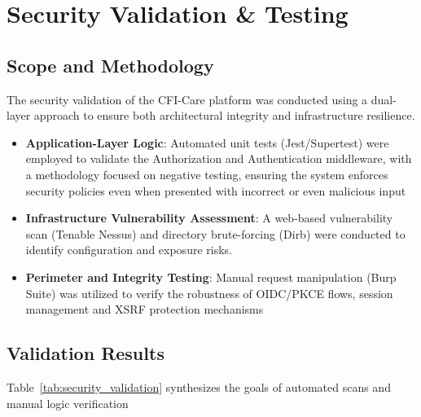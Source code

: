 \section{Security Validation \& Testing}\label{sec:testing_results}

\subsection{Scope and Methodology}
The security validation of the CFI-Care platform was conducted using a dual-layer approach to ensure both architectural integrity and infrastructure resilience.
\begin{itemize}
    \item \textbf{Application-Layer Logic}: Automated unit tests (Jest/Supertest) were employed to validate the Authorization and Authentication middleware, 
    with a methodology focused on negative testing, ensuring the system enforces security policies even when presented with incorrect or even malicious input
    \item \textbf{Infrastructure Vulnerability Assessment}: A web-based vulnerability scan (Tenable Nessus) and directory brute-forcing (Dirb) were conducted to identify configuration and exposure risks.
    \item \textbf{Perimeter and Integrity Testing}: Manual request manipulation (Burp Suite) was utilized to verify the robustness of OIDC/PKCE flows, session management and XSRF protection mechanisms
\end{itemize}

\subsection{Validation Results}
Table~\ref{tab:security_validation} synthesizes the goals of automated scans and manual logic verification

